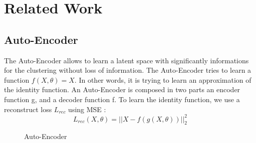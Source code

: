 \section{Related Work}\label{sec:related}

\subsection{Auto-Encoder}
The Auto-Encoder allows to learn a latent space with significantly
informations for the clustering without loss of information.
The Auto-Encoder tries to learn a function $f (X, \theta) = X$. In
other words, it is trying to learn an approximation of the identity
function. An Auto-Encoder is composed in two parts an encoder function
g, and a decoder function f. To learn the identity function, we use a
reconstruct loss $L_{rec}$ using MSE :
\begin{equation}
  L_{rec}(X, \theta) = || X - f(g(X, \theta)) ||_2^2 
\end{equation}

\begin{figure}[!h]
  \centering
  
  \caption{Auto-Encoder}
  \label{fig:AE}
\end{figure}
